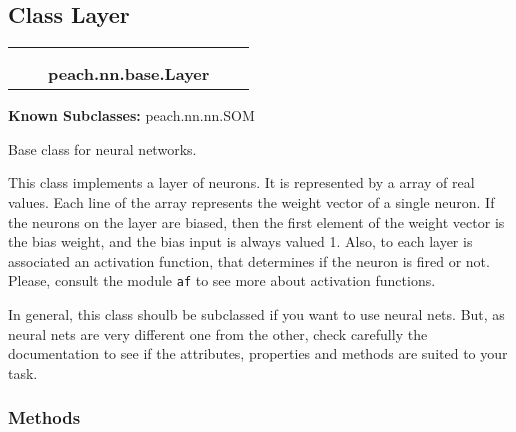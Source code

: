 
\subsection{Class Layer}

    \label{peach:nn:base:Layer}
\begin{tabular}{cccccc}
\multicolumn{2}{r}{\settowidth{\BCL}{object}\multirow{2}{\BCL}{object}}
&&
  \\\cline{3-3}
  &&\multicolumn{1}{c|}{}
&&
  \\
&&\multicolumn{2}{l}{\textbf{peach.nn.base.Layer}}
\end{tabular}

\textbf{Known Subclasses:} peach.nn.nn.SOM


Base class for neural networks.

This class implements a layer of neurons. It is represented by a array of
real values. Each line of the array represents the weight vector of a
single neuron. If the neurons on the layer are biased, then the first
element of the weight vector is the bias weight, and the bias input is
always valued 1. Also, to each layer is associated an activation function,
that determines if the neuron is fired or not. Please, consult the module
\texttt{af} to see more about activation functions.

In general, this class shoulb be subclassed if you want to use neural nets.
But, as neural nets are very different one from the other, check carefully
the documentation to see if the attributes, properties and methods are
suited to your task.


  \subsubsection{Methods}

    \label{peach:nn:base:Layer:__call__}

